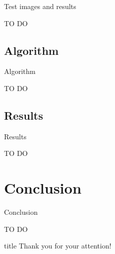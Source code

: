 \documentclass[aspectratio=169, 11pt]{beamer}
\newcommand{\TODO}{\begin{center}\Large\alert{TO DO}\end{center}}
\begin{document}
\begin{frame}{Test images and results}
  \TODO
\end{frame}

\subsection{Algorithm}

\begin{frame}{Algorithm}
  \TODO
\end{frame}

\subsection{Results}

\begin{frame}{Results}
  \TODO
\end{frame}

\section{Conclusion}

\begin{frame}{Conclusion}
  \TODO
\end{frame}

\begin{frame}
  \begin{beamercolorbox}[sep=8pt, center, colsep=-4bp, rounded=true, shadow=true]{title}
    Thank you for your attention!
  \end{beamercolorbox}
  \bigskip
\end{frame}
\end{document}
